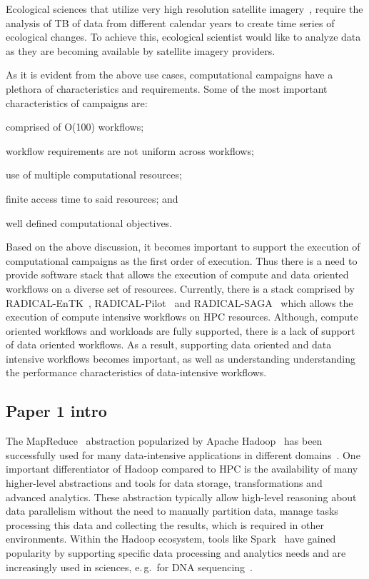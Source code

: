 Ecological sciences that utilize very high resolution satellite imagery~\cite{goncalves2020sealnet}, require the analysis of TB of data from different calendar years to create time series of ecological changes.
To achieve this, ecological scientist would like to analyze data as they are becoming available by satellite imagery providers. 


As it is evident from the above use cases, computational campaigns have a plethora of characteristics and requirements.
Some of the most important characteristics of campaigns are:
\begin{inparaenum}[(1)]
    \item comprised of O(100) workflows;
    \item workflow requirements are not uniform across workflows;
    \item use of multiple computational resources;
    \item finite access time to said resources; and
    \item well defined computational objectives.
\end{inparaenum}

Based on the above discussion, it becomes important to support the execution of computational campaigns as the first order of execution.
Thus there is a need to provide software stack that allows the execution of compute and data oriented workflows on a diverse set of resources.
Currently, there is a stack comprised by RADICAL-EnTK~\cite{balasubramanian2018harnessing}, RADICAL-Pilot~\cite{merzky2019using} and RADICAL-SAGA~\cite{merzky2015saga} which allows the execution of compute intensive workflows on HPC resources.
Although, compute oriented workflows and workloads are fully supported, there is a lack of support of data oriented workflows.
As a result, supporting data oriented and data intensive workflows becomes important, as well as understanding understanding the performance characteristics of data-intensive workflows.


\subsection*{Paper 1 intro}

The MapReduce~\cite{mapreduce} abstraction popularized by Apache Hadoop~\cite{hadoop} has been successfully used for many data-intensive applications in different domains~\cite{37684}.
One important differentiator of Hadoop compared to HPC is the availability of many higher-level abstractions and tools for data storage, transformations and advanced analytics.
These abstraction typically allow high-level reasoning about data parallelism without the need to manually partition data, manage tasks processing this data and collecting the results, which is required in other environments.
Within the Hadoop ecosystem, tools like Spark~\cite{Zaharia:2010:SCC:1863103.1863113} have gained popularity by supporting specific data processing and analytics needs and are increasingly used in sciences, e.\,g.\ for DNA sequencing~\cite{Massie:EECS-2013-207}.


